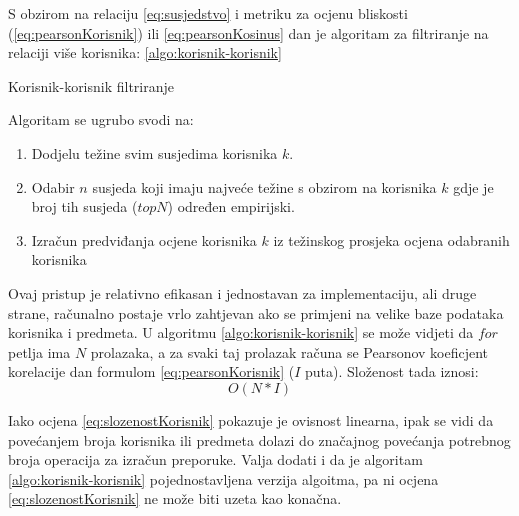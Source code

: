 \documentclass[times, utf8, diplomski, numeric]{fer}
\begin{document}
S obzirom na relaciju \ref{eq:susjedstvo} i metriku za ocjenu bliskosti
(\ref{eq:pearsonKorisnik}) ili \ref{eq:pearsonKosinus} dan je algoritam za
filtriranje na relaciji više korisnika:
\ref{algo:korisnik-korisnik}
\begin{algorithm}
	\caption{Korisnik-korisnik filtriranje}
	\label{algo:korisnik-korisnik}
	\begin{algorithmic}
		\ENDFOR
		\ENDFOR
	\end{algorithmic}
\end{algorithm}

Algoritam se ugrubo svodi na:
\begin{enumerate}
  \item Dodjelu težine svim susjedima korisnika $k$.
  \item Odabir $n$ susjeda koji imaju najveće težine s obzirom na korisnika $k$
  gdje je broj tih susjeda ($topN$) određen empirijski.
  \item Izračun predviđanja ocjene korisnika $k$ iz težinskog prosjeka ocjena
  odabranih korisnika
\end{enumerate}

Ovaj pristup je relativno efikasan i jednostavan za implementaciju, ali druge
strane, računalno postaje vrlo zahtjevan ako se primjeni na velike baze podataka
korisnika i predmeta. U algoritmu \ref{algo:korisnik-korisnik} se može vidjeti
da $for$ petlja ima $N$ prolazaka, a za svaki taj prolazak računa se Pearsonov
koeficjent korelacije dan formulom \ref{eq:pearsonKorisnik} ($I$ puta).
Složenost tada iznosi:
\begin{equation}
\label{eq:slozenostKorisnik}
	O(N \ast I)
\end{equation}

Iako ocjena \ref{eq:slozenostKorisnik} pokazuje je ovisnost linearna,
ipak se vidi da povećanjem broja korisnika ili predmeta dolazi do
značajnog povećanja potrebnog broja operacija za izračun preporuke. 
Valja dodati i da je algoritam \ref{algo:korisnik-korisnik} pojednostavljena
verzija algoitma, pa ni ocjena \ref{eq:slozenostKorisnik} ne može biti uzeta
kao konačna.
\end{document}
